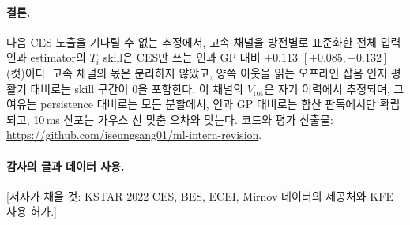 \documentclass[10pt,twocolumn,letterpaper]{article}
\newcommand{\Ti}{\ensuremath{T_i}}
\newcommand{\Vrot}{\ensuremath{V_\mathrm{rot}}}
\begin{document}
\paragraph{결론.} 다음 CES 노출을 기다릴 수 없는 추정에서, 고속 채널을 방전별로 표준화한 전체
입력 인과 estimator의 \Ti{} skill은 CES만 쓰는 인과 GP 대비 $+0.113$ $[+0.085, +0.132]$(컷)이다. 고속 채널의 몫은 분리하지
않았고, 양쪽 이웃을 읽는 오프라인 잡음 인지 평활기 대비로는 skill 구간이 0을 포함한다.
이 채널의 \Vrot{}은 자기 이력에서 추정되며, 그 여유는 persistence 대비로는 모든 분할에서,
인과 GP 대비로는 합산 판독에서만 확립되고, 10\,ms 산포는 가우스 선 맞춤 오차와 맞는다. 코드와 평가 산출물:
\url{https://github.com/iseungsang01/ml-intern-revision}.

\paragraph{감사의 글과 데이터 사용.} [저자가 채울 것: KSTAR 2022 CES, BES, ECEI, Mirnov
데이터의 제공처와 KFE 사용 허가.]

{\small


}
\end{document}
